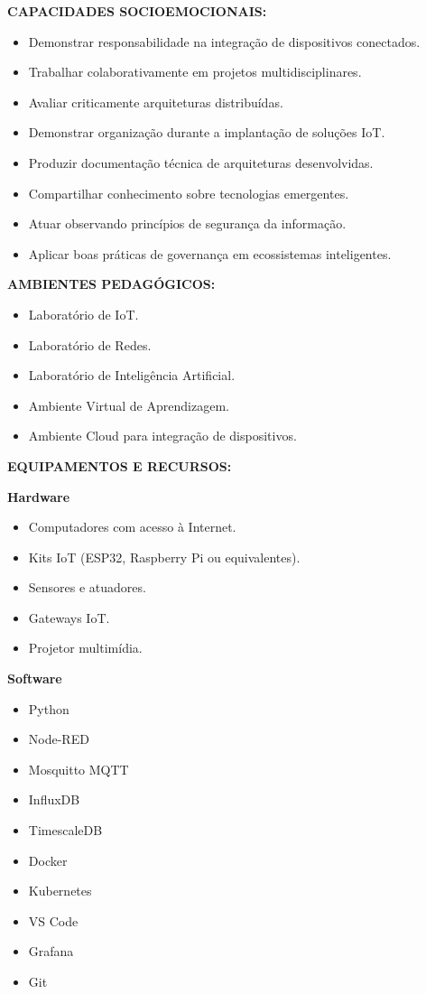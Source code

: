 \textbf{CAPACIDADES SOCIOEMOCIONAIS:}

\begin{itemize}
\item Demonstrar responsabilidade na integração de dispositivos conectados.
\item Trabalhar colaborativamente em projetos multidisciplinares.
\item Avaliar criticamente arquiteturas distribuídas.
\item Demonstrar organização durante a implantação de soluções IoT.
\item Produzir documentação técnica de arquiteturas desenvolvidas.
\item Compartilhar conhecimento sobre tecnologias emergentes.
\item Atuar observando princípios de segurança da informação.
\item Aplicar boas práticas de governança em ecossistemas inteligentes.
\end{itemize}

\textbf{AMBIENTES PEDAGÓGICOS:}

\begin{itemize}
\item Laboratório de IoT.
\item Laboratório de Redes.
\item Laboratório de Inteligência Artificial.
\item Ambiente Virtual de Aprendizagem.
\item Ambiente Cloud para integração de dispositivos.
\end{itemize}

\textbf{EQUIPAMENTOS E RECURSOS:}

\textbf{Hardware}

\begin{itemize}
\item Computadores com acesso à Internet.
\item Kits IoT (ESP32, Raspberry Pi ou equivalentes).
\item Sensores e atuadores.
\item Gateways IoT.
\item Projetor multimídia.
\end{itemize}

\textbf{Software}

\begin{itemize}
\item Python
\item Node-RED
\item Mosquitto MQTT
\item InfluxDB
\item TimescaleDB
\item Docker
\item Kubernetes
\item VS Code
\item Grafana
\item Git
\end{itemize}
